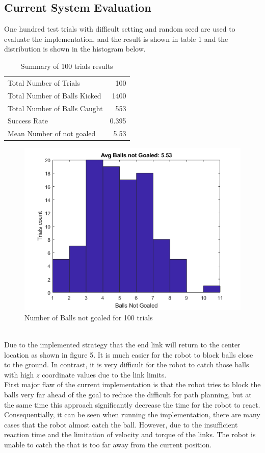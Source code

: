 \documentclass[a4paper]{article}
\begin{document}
\subsection{Current System Evaluation}
One hundred test trials with difficult setting and random seed are used to evaluate the implementation, and the result is shown in table 1 and the distribution is shown in the histogram below.
\begin{table}[h]
\centering
\begin{tabular}{l|r}
Total Number of Trials & 100 \\
Total Number of Balls Kicked & 1400\\
Total Number of Balls Caught & 553\\
Success Rate & 0.395 \\
Mean Number of not goaled & 5.53
\end{tabular}
\caption{\label{tab:widgets}Summary of 100 trials results}
\end{table}
\begin{figure}[h]
\centering
\includegraphics[scale=0.8]{scoreHist.png}
\caption{Number of Balls not goaled for 100 trials}
\end{figure}
\\
Due to the implemented strategy that the end link will return to the center location as shown in figure 5. It is much easier for the robot to block balls close to the ground. In contrast, it is very difficult for the robot to catch those balls with high $z$ coordinate values due to the link limits. 
\\
First major flaw of the current implementation is that the robot tries to block the balls very far ahead of the goal to reduce the difficult for path planning, but at the same time this approach significantly decrease the time for the robot to react. Consequentially, it can be seen when running the implementation, there are many cases that the robot almost catch the ball. However, due to the insufficient reaction time and the limitation of velocity and torque of the links. The robot is unable to catch the that is too far away from the current position. 
\end{document}
